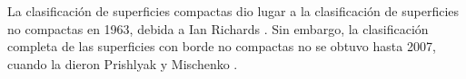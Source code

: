 \documentclass[10pt]{report}
\newcommand{\enfatiza}[1]{\textbf{\textit{#1}}}
\theoremstyle{definition}
\newtheorem{defin}{Definición}[section]
\newtheorem{tma}[defin]{Teorema}
\newtheorem{lema}[defin]{Lema}
\begin{document}
La clasificación de superficies compactas dio lugar a la clasificación de superficies no compactas en 1963, debida a Ian Richards \cite{richards}. Sin embargo, la clasificación completa de las superficies con borde no compactas no se obtuvo hasta 2007, cuando la dieron Prishlyak y Mischenko \cite{prishlyak}.


\appendix

\end{document}
